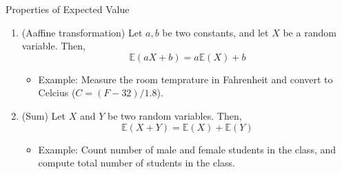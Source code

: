 \documentclass{beamer}
\newcommand{\E}{\mathbb{E}}
\begin{document}
\begin{frame}{Properties of Expected Value}
%

\begin{enumerate}
\item (Aaffine transformation) Let $a,b$ be two constants, and let $X$ be a random variable. Then,
$$ \E(aX+b) = a \E(X) + b$$
\vspace{-0.4cm}
\begin{itemize}
\item Example: Measure the room temprature in Fahrenheit and convert to Celcius ($C=(F-32)/1.8$).
\end{itemize}
\item (Sum) Let $X$ and $Y$ be two random variables. Then,
$$ \E(X+Y) = \E(X)+\E(Y)$$
\vspace{-0.4cm}
\begin{itemize}
\item Example: Count number of male and female students in the class, and compute total number of students in the class.
\end{itemize}
\end{enumerate}
\end{frame}
\end{document}
